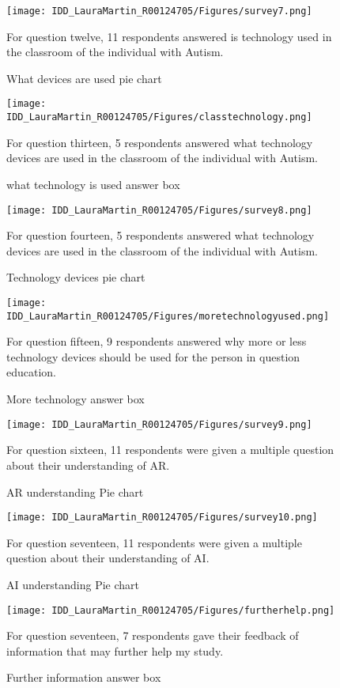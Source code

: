 \begin{figure}[b]
\centering
\texttt{[image: IDD\_LauraMartin\_R00124705/Figures/survey7.png]}
\caption{What devices are used pie chart}
{For question twelve, 11 respondents answered is technology used in the classroom of the individual with Autism. }
\end{figure}

\begin{figure}[b]
\centering
\texttt{[image: IDD\_LauraMartin\_R00124705/Figures/classtechnology.png]}
\caption{what technology is used answer box}
{For question thirteen, 5 respondents answered what technology devices are used in the classroom of the individual with Autism. }
\end{figure}

\begin{figure}[b]
\centering
\texttt{[image: IDD\_LauraMartin\_R00124705/Figures/survey8.png]}
\caption{Technology devices pie chart}
{For question fourteen, 5 respondents answered what technology devices are used in the classroom of the individual with Autism. }
\end{figure}

\begin{figure}[b]
\centering
\texttt{[image: IDD\_LauraMartin\_R00124705/Figures/moretechnologyused.png]}
\caption{More technology answer box}
{For question fifteen, 9 respondents answered why more or less technology devices should be used for the person in question education. }
\end{figure}

\begin{figure}[b]
\centering
\texttt{[image: IDD\_LauraMartin\_R00124705/Figures/survey9.png]}
\caption{AR understanding Pie chart}
{For question sixteen, 11 respondents were given a multiple question about their understanding of AR.}
\end{figure}

\begin{figure}[b]
\centering
\texttt{[image: IDD\_LauraMartin\_R00124705/Figures/survey10.png]}
\caption{AI understanding Pie chart}
{For question seventeen, 11 respondents were given a multiple question about their understanding of AI.}
\end{figure}

\begin{figure}[b]
\centering
\texttt{[image: IDD\_LauraMartin\_R00124705/Figures/furtherhelp.png]}
\caption{Further information answer box}
{For question seventeen, 7 respondents gave their feedback of information that may further help my study.}
\end{figure}

